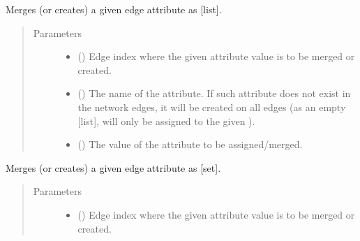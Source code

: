 \documentclass[letterpaper,10pt,english]{sphinxmanual}
\begin{document}
\begin{fulllineitems}
\begin{fulllineitems}
\begin{quote}
\begin{description}
\end{description}\end{quote}

\end{fulllineitems}


\begin{fulllineitems}
\label{\detokenize{main:pypath.main.PyPath.add_list_eattr}}
Merges (or creates) a given edge attribute as {[}list{]}.
\begin{quote}\begin{description}
\item[{Parameters}] \leavevmode\begin{itemize}
\item {} 
 () \textendash{} Edge index where the given attribute value is to be merged
or created.

\item {} 
 () \textendash{} The name of the attribute. If such attribute does not exist
in the network edges, it will be created on all edges (as an
empty {[}list{]},  will only be assigned to the given
).

\item {} 
 () \textendash{} The value of the attribute to be assigned/merged.

\end{itemize}

\end{description}\end{quote}

\end{fulllineitems}


\begin{fulllineitems}
\label{\detokenize{main:pypath.main.PyPath.add_set_eattr}}
Merges (or creates) a given edge attribute as {[}set{]}.
\begin{quote}\begin{description}
\item[{Parameters}] \leavevmode\begin{itemize}
\item {} 
 () \textendash{} Edge index where the given attribute value is to be merged
or created.


\end{itemize}
\end{description}
\end{quote}
\end{fulllineitems}
\end{fulllineitems}
\end{document}
